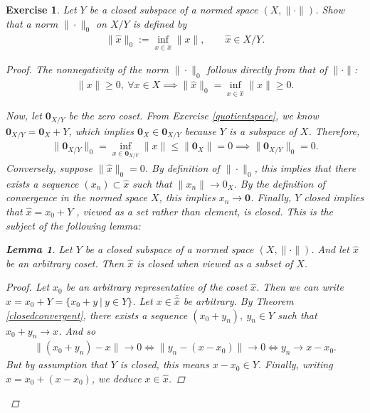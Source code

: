 \documentclass[11pt]{article}
\theoremstyle{mystyle}
\newtheorem{lm}{Lemma}[section]
\newtheorem{protoexer}{Exercise}[section]
\newenvironment{exer}
{\colorlet{shadecolor}{blue!15}\begin{shaded}\begin{protoexer}}
{\end{protoexer}\end{shaded}}
\newcommand{\0}{\mathbf{0}}
\begin{document}
\begin{exer}
Let $Y$ be a closed subspace of a normed space $(X, \| \cdot \|)$. Show that a norm $\|\cdot\|_0$ on $X/Y$ is defined by
\begin{align*}
    \|\hat{x}\|_0 := \inf_{x \in \hat{x}} \|x\|, \qquad \hat{x} \in X/Y.
\end{align*}
\begin{proof}
The nonnegativity of the norm $\|\cdot\|_0$ follows directly from that of $\|\cdot\|$: 
\begin{align*}
    \|x\| \geq 0, \ \forall x \in X \implies \|\hat{x}\|_0 = \inf_{x \in \hat{x}}\|x\| \geq 0.
\end{align*}

Now, let $\0_{X/Y}$ be the zero coset. From Exercise \ref{quotientspace}, we know $\0_{X/Y} = \0_X + Y$, which implies $\0_X \in \0_{X/Y}$ because $Y$ is a subspace of $X$. Therefore,
\begin{align*}
    \|\0_{X/Y}\|_0 = \inf_{x \in \0_{X/Y}}\|x\| \leq \|\0_X\| = 0 \implies \|\0_{X/Y}\|_0 = 0.
\end{align*}
Conversely, suppose $\|\hat{x}\|_0 = 0$. By definition of $\|\cdot\|_0$, this implies that there exists a sequence $(x_n) \subset \hat{x}$ such that $\|x_n\| \longrightarrow 0_X$. By the definition of convergence in the normed space $X$, this implies $x_n \longrightarrow \0$. Finally, $Y$ closed implies that $\hat{x} = x_0 + Y$ , viewed as a set rather than element, is closed. This is the subject of the following lemma:

\begin{lm}
Let $Y$ be a closed subspace of a normed space $(X, \| \cdot \|)$. And let $\hat{x}$ be an arbitrary coset. Then $\hat{x}$ is closed when viewed as a subset of $X$. 
\end{lm}
\begin{proof}
Let $x_0$ be an arbitrary representative of the coset $\hat{x}$. Then we can write $\hat{x} = x_0 + Y = \{x_0 + y \ | \ y \in Y \}$. Let $x \in \bar{\hat{x}}$ be arbitrary. By Theorem \ref{closedconvergent}, there exists a sequence $(x_0 + y_n), \ y_n \in Y$ such that $x_0 + y_n \longrightarrow x$. And so 
\begin{align*}
    \|(x_0 + y_n) - x \| \longrightarrow 0 \iff  \|y_n - (x - x_0) \|  \longrightarrow 0  \iff y_n \longrightarrow x - x_0.
\end{align*}
But by assumption that $Y$ is closed, this means $x - x_0 \in Y$. Finally, writing $x = x_0 + (x - x_0)$, we deduce $x \in \hat{x}$.
\end{proof}


\end{proof}
\end{exer}
\end{document}
